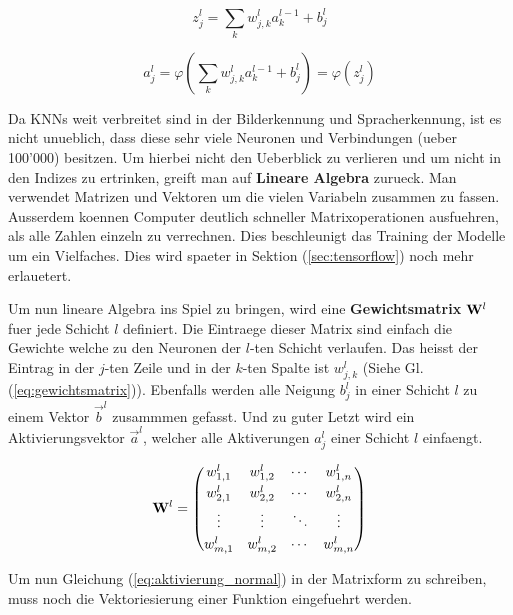 \documentclass[../main]{subfiles}
\begin{document}
\begin{equation}\label{eq:gewichtete_summe_normal}
  z_j^l = \sum_k w_{j,k}^l a_k^{l-1} + b_j^l
\end{equation}
\par
\begin{equation}\label{eq:aktivierung_normal}
  a_j^l = \varphi\left(\sum_k w_{j,k}^l a_k^{l-1} + b_j^l \right) = \varphi \left( z_j^l \right)
\end{equation}
\par\bigskip
Da KNNs weit verbreitet sind in der Bilderkennung und Spracherkennung, ist es
nicht unueblich, dass diese sehr viele Neuronen und Verbindungen (ueber 100'000) besitzen.
Um hierbei nicht den Ueberblick zu verlieren und um nicht in den Indizes zu
ertrinken, greift man auf \textbf{Lineare Algebra} zurueck. Man verwendet
Matrizen und Vektoren um die vielen Variabeln zusammen zu fassen.
Ausserdem koennen Computer deutlich schneller Matrixoperationen ausfuehren, als
alle Zahlen einzeln zu verrechnen. Dies beschleunigt das Training der Modelle um
ein Vielfaches. Dies wird spaeter in Sektion
(\ref{sec:tensorflow}) noch mehr erlauetert.
\par\medskip
Um nun lineare Algebra ins Spiel zu bringen, wird eine \textbf{Gewichtsmatrix}
$\mathbf{W}^l$ fuer jede Schicht $l$ definiert.
Die Eintraege dieser Matrix sind einfach die Gewichte welche zu den Neuronen der
$l$-ten Schicht verlaufen. Das heisst der Eintrag in der $j$-ten Zeile und in
der $k$-ten Spalte ist $w_{j,k}^l$ (Siehe Gl. (\ref{eq:gewichtsmatrix})). Ebenfalls werden alle Neigung $b_j^l$ in
einer Schicht $l$ zu einem Vektor $\vec{b}^l$ zusammmen gefasst. Und zu guter
Letzt wird ein Aktivierungsvektor $\vec{a}^l$, welcher alle Aktiverungen $a_j^l$
einer Schicht $l$ einfaengt.

\begin{equation}\label{eq:gewichtsmatrix}
  \mathbf{W}^l =
  \begin{pmatrix}
    w_{1,1}^l & w_{1,2}^l & \cdots & w_{1,n}^l \\[0.3em]
    w_{2,1}^l & w_{2,2}^l & \cdots & w_{2,n}^l \\[0.3em]
    \vdots & \vdots & \ddots & \vdots \\[0.3em]
    w_{m,1}^l & w_{m,2}^l & \cdots & w_{m,n}^l
  \end{pmatrix}
\end{equation}

Um nun Gleichung (\ref{eq:aktivierung_normal}) in der Matrixform zu schreiben,
muss noch die Vektoriesierung einer Funktion eingefuehrt werden.
\par\medskip
\end{document}
